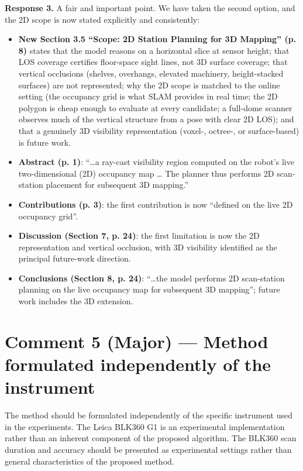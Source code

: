 \textbf{Response 3.} A fair and important point. We have taken the second option, and the 2D scope is now stated explicitly and consistently:
\begin{itemize}
\item \textbf{New Section 3.5 “Scope: 2D Station Planning for 3D Mapping” (p. 8)} states that the model reasons on a horizontal slice at sensor height; that LOS coverage certifies floor-space sight lines, not 3D surface coverage; that vertical occlusions (shelves, overhangs, elevated machinery, height-stacked surfaces) are not represented; why the 2D scope is matched to the online setting (the occupancy grid is what SLAM provides in real time; the 2D polygon is cheap enough to evaluate at every candidate; a full-dome scanner observes much of the vertical structure from a pose with clear 2D LOS); and that a genuinely 3D visibility representation (voxel-, octree-, or surface-based) is future work.
\item \textbf{Abstract (p. 1)}: “…a ray-cast visibility region computed on the robot’s live two-dimensional (2D) occupancy map … The planner thus performs 2D scan-station placement for subsequent 3D mapping.”
\item \textbf{Contributions (p. 3)}: the first contribution is now “defined on the live 2D occupancy grid”.
\item \textbf{Discussion (Section 7, p. 24)}: the first limitation is now the 2D representation and vertical occlusion, with 3D visibility identified as the principal future-work direction.
\item \textbf{Conclusions (Section 8, p. 24)}: “…the model performs 2D scan-station planning on the live occupancy map for subsequent 3D mapping”; future work includes the 3D extension.
\end{itemize}

\section*{Comment 5 (Major) — Method formulated independently of the instrument}

\begin{quoting}
The method should be formulated independently of the specific instrument used in the experiments. The Leica BLK360 G1 is an experimental implementation rather than an inherent component of the proposed algorithm. The BLK360 scan duration and accuracy should be presented as experimental settings rather than general characteristics of the proposed method.
\end{quoting}

